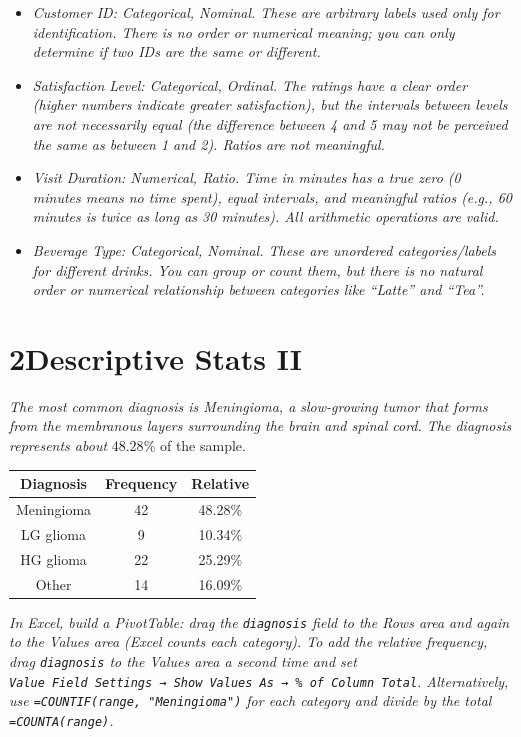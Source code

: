 \documentclass[
  11pt,
  letterpaper,
  DIV=11,
  numbers=noendperiod,
  oneside,
  open=any]{scrreprt}
\providecommand{\tightlist}{%
  \setlength{\itemsep}{0pt}\setlength{\parskip}{0pt}}\usepackage{longtable,booktabs,array}
\newcommand{\bsanswerchapter}[2]{%
  \section*{\textcolor{bsaccent}{#1}\hspace{0.6em}#2}%
  \addcontentsline{toc}{section}{#1\hspace{0.6em}#2}}
\newenvironment{bsanswerkey}[2]{%
  \begin{tcolorbox}[bsbase, colback=bspaper2, colframe=bsline, fontupper=\small,
    title={\hypertarget{a-#1}{}\label{a-#1}\hyperlink{q-#1}{\textcolor{bsink2}{\MakeUppercase{#2}}}\hfill
      \hyperlink{q-#1}{\textcolor{bsaccent}{\normalfont\footnotesize back to page \pageref{q-#1}}}}]}%
  {\end{tcolorbox}}
\begin{document}
\begin{bsanswerkey}{bsans6}{Exercise 3}

\begin{itemize}
\tightlist
\item
  \emph{Customer ID: Categorical, Nominal. These are arbitrary labels
  used only for identification. There is no order or numerical meaning;
  you can only determine if two IDs are the same or different.}
\item
  \emph{Satisfaction Level: Categorical, Ordinal. The ratings have a
  clear order (higher numbers indicate greater satisfaction), but the
  intervals between levels are not necessarily equal (the difference
  between 4 and 5 may not be perceived the same as between 1 and 2).
  Ratios are not meaningful.}
\item
  \emph{Visit Duration: Numerical, Ratio. Time in minutes has a true
  zero (0 minutes means no time spent), equal intervals, and meaningful
  ratios (e.g., 60 minutes is twice as long as 30 minutes). All
  arithmetic operations are valid.}
\item
  \emph{Beverage Type: Categorical, Nominal. These are unordered
  categories/labels for different drinks. You can group or count them,
  but there is no natural order or numerical relationship between
  categories like ``Latte'' and ``Tea''.}
\end{itemize}

\end{bsanswerkey}

\bsanswerchapter{2}{Descriptive Stats II}

\begin{bsanswerkey}{bsans7}{Exercise 1, question 1}

\emph{The most common diagnosis is Meningioma, a slow-growing tumor that
forms from the membranous layers surrounding the brain and spinal cord.
The diagnosis represents about} \(48.28\)\% of the sample.

\begin{center}
\begin{tabular}{ccc}
\toprule
Diagnosis & Frequency & Relative \\
\midrule
Meningioma & 42 & 48.28\% \\
LG glioma & 9 & 10.34\% \\
HG glioma & 22 & 25.29\% \\
Other & 14 & 16.09\% \\
\bottomrule
\end{tabular}
\end{center}

\emph{In Excel, build a PivotTable: drag the \texttt{diagnosis} field to
the Rows area and again to the Values area (Excel counts each category).
To add the relative frequency, drag \texttt{diagnosis} to the Values
area a second time and set
\texttt{Value\ Field\ Settings\ →\ Show\ Values\ As\ →\ \%\ of\ Column\ Total}.
Alternatively, use \texttt{=COUNTIF(range,\ "Meningioma")} for each
category and divide by the total \texttt{=COUNTA(range)}.}

\end{bsanswerkey}
\end{document}
